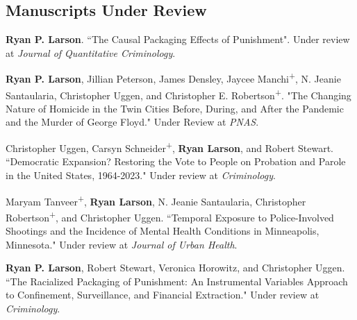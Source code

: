 \documentclass[letterpaper]{article}
\newenvironment{publist}{%
  \begin{list}{}{%
    \setlength{\leftmargin}{0cm}   %
    \setlength{\labelwidth}{2cm}     %
    \setlength{\labelsep}{0.5cm}     %
  }%
}{%
  \end{list}%
}
\begin{document}
\subsection*{Manuscripts Under Review}
\begin{publist}

\item \textbf{Ryan P. Larson}. ``The Causal Packaging Effects of Punishment". Under review at \textit{Journal of Quantitative Criminology}.

\item \textbf{Ryan P. Larson}, Jillian Peterson, James Densley, Jaycee Manchi\textsuperscript{+}, N. Jeanie Santaularia, Christopher Uggen, and Christopher E. Robertson\textsuperscript{+}. "The Changing Nature of Homicide in the Twin Cities Before, During, and After the Pandemic and the Murder of George Floyd." Under Review at \textit{PNAS}. 

\item Christopher Uggen, Carsyn Schneider\textsuperscript{+}, \textbf{Ryan Larson}, and Robert Stewart. ``Democratic Expansion? Restoring the Vote to People on Probation and Parole in the United States, 1964-2023." Under review at \textit{Criminology}.

\item Maryam Tanveer\textsuperscript{+}, \textbf{Ryan Larson}, N. Jeanie Santaularia, Christopher Robertson\textsuperscript{+}, and Christopher Uggen. ``Temporal Exposure to Police-Involved Shootings and the Incidence of Mental Health Conditions in Minneapolis, Minnesota." Under review at \textit{Journal of Urban Health}. 

\item \textbf{Ryan P. Larson}, Robert Stewart, Veronica Horowitz, and Christopher Uggen. ``The Racialized Packaging of Punishment: An Instrumental Variables Approach to Confinement, Surveillance, and Financial Extraction." Under review at \textit{Criminology}.

\end{publist}
\end{document}
